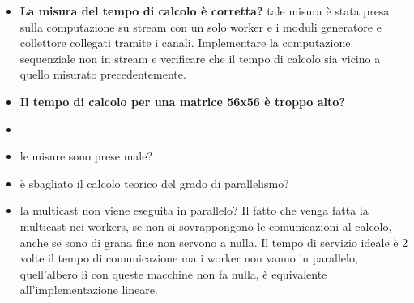 \documentclass[a4paper]{article}
\begin{document}
\begin{itemize}
\item \textbf{La misura del tempo di calcolo \`e corretta?} tale misura \`e stata presa sulla computazione su stream con un solo worker e i moduli generatore e collettore collegati tramite i canali. Implementare la computazione sequenziale non in stream e verificare che il tempo di calcolo sia vicino a quello misurato precedentemente.
\item \textbf{Il tempo di calcolo per una matrice 56x56 \`e troppo alto?} 
\item 
\end{itemize}

\begin{itemize}
\item le misure sono prese male?
\item \`e sbagliato il calcolo teorico del grado di parallelismo?
\item la multicast non viene eseguita in parallelo? Il fatto che venga fatta la multicast nei workers, se non si sovrappongono le comunicazioni al calcolo, anche se sono di grana fine non servono a nulla. Il tempo di servizio ideale \`e 2 volte il tempo di comunicazione ma i worker non vanno in parallelo, quell'albero l\`i con queste macchine non fa nulla, \`e equivalente all'implementazione lineare.
\end{itemize}

\newpage
\end{document}
